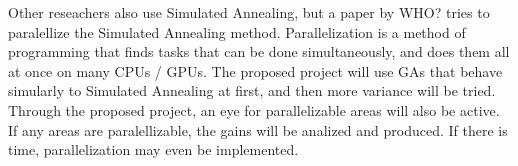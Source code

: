 Other reseachers also use Simulated Annealing, but a paper by WHO? \cite{who}
tries to paralellize the Simulated Annealing method. Parallelization is a 
method of programming that finds tasks that can be done simultaneously, and
does them all at once on many CPUs / GPUs. The proposed project will use GAs
that behave simularly to Simulated Annealing at first, and then more variance
will be tried. Through the proposed project, an eye for parallelizable areas
will also be active. If any areas are paralellizable, the gains will be 
analized and produced. If there is time, parallelization may even be 
implemented.



